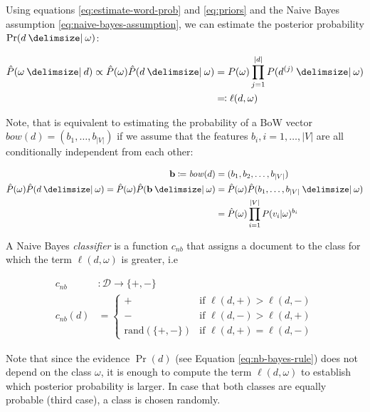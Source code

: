 Using equations \ref{eq:estimate-word-prob} and \ref{eq:priors} and the Naive
Bayes assumption \ref{eq:naive-bayes-assumption}, we can estimate the posterior
probability $\Pr(d \given \omega)$:

\begin{equation}
\begin{split}
\hat{P}(\omega \given d) \propto \hat{P}(\omega)\hat{P}(d\given \omega)
&= P(\omega)\prod\limits_{j=1}^{|d|} P(d^{(j)} \given \omega) \\ &\eqqcolon
\ell(d,\omega)
\end{split}
\end{equation}

Note, that is equivalent to estimating the probability of a BoW vector $bow(d) = (b_1,\ldots,b_{|V|})$
if we assume that the features $b_i, i=1,\ldots,|V|$ are all conditionally independent from each other:

\begin{equation}
\begin{split}
\textbf{b} \coloneqq \mli{bow}(d) &= (b_1, b_2, \ldots, b_{|V|}) \\ 
\hat{P}(\omega)\hat{P}(d\given \omega) = \hat{P}(\omega)\hat{P}(\mathbf{b}
\given \omega) &= \hat{P}(\omega)\hat{P}(b_1,\ldots,b_{|V|} \given
\omega)\\
&= \hat{P}(\omega)\prod\limits_{i=1}^{|V|}P(v_i|\omega)^{ b_i }
\end{split}
\end{equation}

A Naive Bayes \emph{classifier} is a function $c_{nb}$ that assigns a document to the
class for which the term $\ell(d, \omega)$ is greater, i.e

\begin{equation}
\begin{split}
c_{nb}&: \mathcal{D} \to \{+,-\} \\
c_{nb}(d) &= \begin{cases} + & \text{if~} \ell(d,+) > \ell(d,-) \\ - &
\text{if~} \ell(d,-) > \ell(d,+) \\ \text{rand}(\{+,-\}) &
\text{if~} \ell(d,+) = \ell(d,-)\end{cases}
\end{split}
\end{equation}

Note that since the evidence $\Pr(d)$ (see Equation
\ref{eq:nb-bayes-rule}) does not depend on the class $\omega$, it is enough to
compute the term $\ell(d,\omega)$ to establish which posterior probability is
larger. In case that both classes are equally probable (third case), a class is
chosen randomly. 

